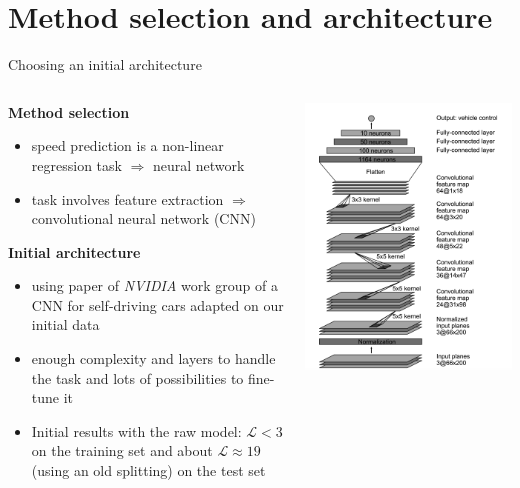\section{Method selection and architecture}

\begin{frame}{Choosing an initial architecture}
	\begin{columns}[c]
		\begin{column}{0.55\textwidth}
			\textbf{Method selection}
			\begin{itemize}
				\item<+-> speed prediction is a non-linear regression task $\Rightarrow$ neural network
				\item<+-> task involves feature extraction $\Rightarrow$ convolutional neural network (CNN)
			\end{itemize}
			\textbf{Initial architecture}
			\begin{itemize}
				\item<+-> using paper of \textit{NVIDIA} work group \cite{NVIDIA2016} of a CNN for self-driving cars adapted on our initial data
				\item<+-> enough complexity and layers to handle the task and lots of possibilities to fine-tune it
				\item<+-> Initial results with the raw model: $\mathcal{L} < 3$ on the training set and about $\mathcal{L} \approx 19$ (using an old splitting) on the test set
			\end{itemize}
		\end{column}
		\begin{column}{0.4\textwidth}
			\includegraphics[width=\textwidth]{./imgs/NetworkOriginal.png}

\end{column}
\end{columns}
\end{frame}
